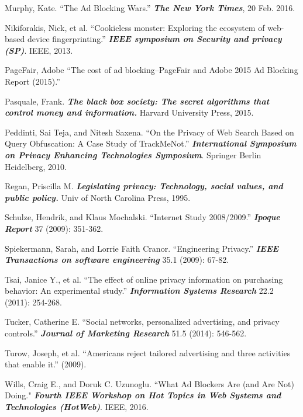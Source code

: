 \documentclass[conference]{IEEEtran}
\begin{document}
\begin{thebibliography}{99}
 Murphy, Kate. “The Ad Blocking Wars.” \textbf{\textit{The New York Times}}, 20 Feb. 2016.

 Nikiforakis, Nick, et al. “Cookieless monster: Exploring the ecosystem of web-based device fingerprinting.” \textbf{\textit{IEEE symposium on Security and privacy (SP)}}. IEEE, 2013.

 PageFair, Adobe “The cost of ad blocking–PageFair and Adobe 2015 Ad Blocking Report (2015).”

 Pasquale, Frank. \textbf{\textit{The black box society: The secret algorithms that control money and information.}} Harvard University Press, 2015.

 Peddinti, Sai Teja, and Nitesh Saxena. “On the Privacy of Web Search Based on Query
Obfuscation: A Case Study of TrackMeNot.” \textbf{\textit{International Symposium on Privacy Enhancing Technologies Symposium}}. Springer Berlin Heidelberg, 2010.

 Regan, Priscilla M. \textbf{\textit{Legislating privacy: Technology, social values, and public policy.}} Univ of North Carolina Press, 1995.

 Schulze, Hendrik, and Klaus Mochalski. “Internet Study 2008/2009.” \textbf{\textit{Ipoque Report}} 37 (2009): 351-362.

 Spiekermann, Sarah, and Lorrie Faith Cranor. “Engineering Privacy.” \textbf{\textit{IEEE Transactions on software engineering}} 35.1 (2009): 67-82.

 Tsai, Janice Y., et al. “The effect of online privacy information on purchasing behavior: An experimental study.” \textbf{\textit{Information Systems Research}} 22.2 (2011): 254-268.

 Tucker, Catherine E. “Social networks, personalized advertising, and privacy controls.” \textbf{\textit{Journal of Marketing Research}} 51.5 (2014): 546-562.

 Turow, Joseph, et al. “Americans reject tailored advertising and three activities that enable it.” (2009).

 Wills, Craig E., and Doruk C. Uzunoglu. “What Ad Blockers Are (and Are Not) Doing." \textbf{\textit{Fourth IEEE Workshop on Hot Topics in Web Systems and Technologies (HotWeb)}}. IEEE, 2016.


\end{thebibliography}
\end{document}
